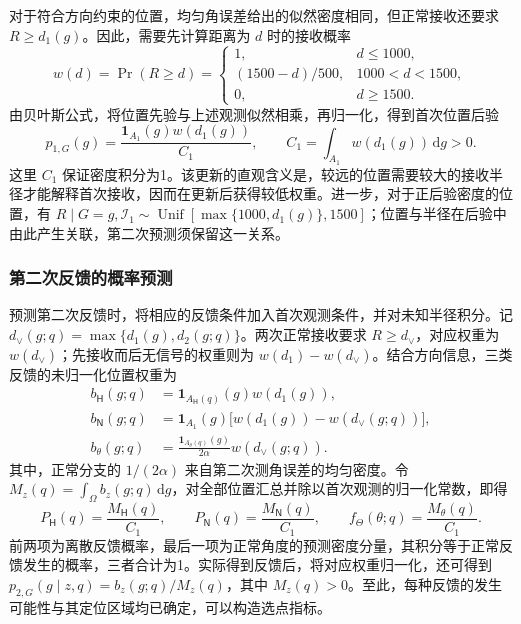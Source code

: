 \documentclass[UTF8,a4paper,zihao=-4,fontset=none]{ctexart}
\begin{document}
对于符合方向约束的位置，均匀角误差给出的似然密度相同，但正常接收还要求 \(R\ge d_1(g)\)。因此，需要先计算距离为 \(d\) 时的接收概率
\begin{equation}
 w(d)=\Pr(R\ge d)=
 \begin{cases}
 1,&d\le1000,\\
 (1500-d)/500,&1000<d<1500,\\
 0,&d\ge1500.
 \end{cases}
\label{eq:q2-pair-weight}
\end{equation}
由贝叶斯公式，将位置先验与上述观测似然相乘，再归一化，得到首次位置后验
\begin{equation}
 p_{1,G}(g)=\frac{\mathbf1_{A_1}(g)w(d_1(g))}{C_1},
 \qquad C_1=\int_{A_1}w(d_1(g))\,\mathrm dg>0.
\label{eq:q2-pair-posterior}
\end{equation}
这里 \(C_1\) 保证密度积分为1。该更新的直观含义是，较远的位置需要较大的接收半径才能解释首次接收，因而在更新后获得较低权重。进一步，对于正后验密度的位置，有 \(R\mid G=g,\mathcal I_1\sim\operatorname{Unif}[\max\{1000,d_1(g)\},1500]\)；位置与半径在后验中由此产生关联，第二次预测须保留这一关系。

\subsubsection{第二次反馈的概率预测}

预测第二次反馈时，将相应的反馈条件加入首次观测条件，并对未知半径积分。记 \(d_\vee(g;q)=\max\{d_1(g),d_2(g;q)\}\)。两次正常接收要求 \(R\ge d_\vee\)，对应权重为 \(w(d_\vee)\)；先接收而后无信号的权重则为 \(w(d_1)-w(d_\vee)\)。结合方向信息，三类反馈的未归一化位置权重为
\begin{equation}
\begin{aligned}
 b_{\mathsf H}(g;q)&=\mathbf1_{A_{\mathsf H}(q)}(g)w(d_1(g)),\\
 b_{\mathsf N}(g;q)&=\mathbf1_{A_1}(g)\bigl[w(d_1(g))-w(d_\vee(g;q))\bigr],\\
 b_\theta(g;q)&=\frac{\mathbf1_{A_\theta(q)}(g)}{2\alpha}w(d_\vee(g;q)).
\end{aligned}
\label{eq:q2-pair-feedback-weights}
\end{equation}
其中，正常分支的 \(1/(2\alpha)\) 来自第二次测角误差的均匀密度。令 \(M_z(q)=\int_\Omega b_z(g;q)\,\mathrm dg\)，对全部位置汇总并除以首次观测的归一化常数，即得
\begin{equation}
 P_{\mathsf H}(q)=\frac{M_{\mathsf H}(q)}{C_1},\qquad
 P_{\mathsf N}(q)=\frac{M_{\mathsf N}(q)}{C_1},\qquad
 f_\Theta(\theta;q)=\frac{M_\theta(q)}{C_1}.
\label{eq:q2-pair-prediction}
\end{equation}
前两项为离散反馈概率，最后一项为正常角度的预测密度分量，其积分等于正常反馈发生的概率，三者合计为1。实际得到反馈后，将对应权重归一化，还可得到 \(p_{2,G}(g\mid z,q)=b_z(g;q)/M_z(q)\)，其中 \(M_z(q)>0\)。至此，每种反馈的发生可能性与其定位区域均已确定，可以构造选点指标。
\end{document}
